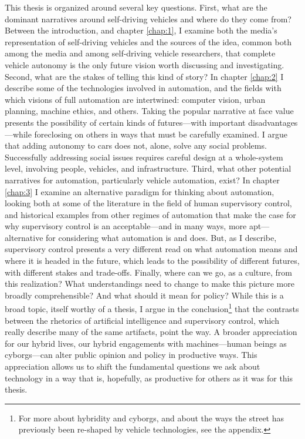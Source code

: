 This thesis is organized around several key questions. First, what are
the dominant narratives around self-driving vehicles and where do they
come from? Between the introduction, and chapter \ref{chap:1}, I
examine both the media's representation of self-driving vehicles and
the sources of the idea, common both among the media and among
self-driving vehicle researchers, that complete vehicle autonomy is
the only future vision worth discussing and investigating. Second,
what are the stakes of telling this kind of story? In chapter
\ref{chap:2} I describe some of the technologies involved in
automation, and the fields with which visions of full automation are
intertwined: computer vision, urban planning, machine ethics, and
others. Taking the popular narrative at face value presents the
possibility of certain kinds of futures---with important
disadvantages---while foreclosing on others in ways that must be
carefully examined. I argue that adding autonomy to cars does not,
alone, solve any social problems. Successfully addressing social
issues requires careful design at a whole-system level, involving
people, vehicles, and infrastructure. Third, what other potential
narratives for automation,
particularly vehicle automation, exist? In chapter \ref{chap:3} I
examine an alternative paradigm for thinking about automation, looking
both at some of the literature in the field of human supervisory
control, and historical examples from other regimes of automation that
make the case for why supervisory control is an acceptable---and in
many ways, more apt---alternative for considering what automation is
and does. But, as I describe, supervisory control presents a very
different read on what automation means and where it is headed in the
future, which leads to the possibility of different futures, with
different stakes and trade-offs. Finally, where can we go, as a
culture, from this realization? What understandings need to change to
make this picture more broadly comprehensible? And what should it mean
for policy? While this is a broad topic, itself worthy of a thesis, I
argue in the conclusion\footnote{For more about hybridity and cyborgs,
and about the ways the street has previously been re-shaped by vehicle
technologies, see the appendix.} that the contrasts
between the rhetorics of artificial intelligence and supervisory
control, which really describe many of the same artifacts, point the
way. A broader appreciation for our hybrid lives, our hybrid
engagements with machines---human beings as cyborgs---can alter public
opinion and policy in
productive ways. This appreciation allows us to shift the fundamental
questions we ask about technology in a way that is, hopefully, as
productive for others as it was for this thesis.

